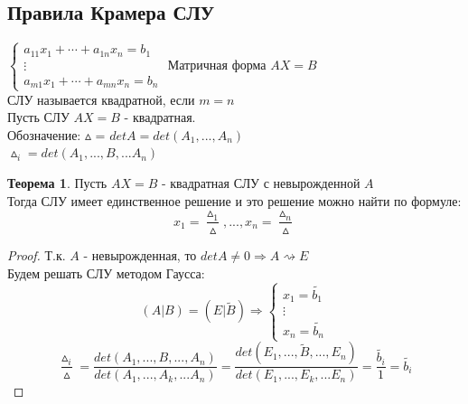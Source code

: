 \documentclass[a4paper, 12pt]{article}
\theoremstyle{definition}
\newtheorem*{theorem}{Теорема}
\begin{document}
  \subsection{Правила Крамера СЛУ}
  $\begin{cases}
    a_{11}x_1 + \cdots + a_{1n}x_n = b_1 \\
    \vdots \\ 
    a_{m1}x_1 + \cdots + a_{mn}x_n = b_n 
  \end{cases}$
  Матричная форма $AX=B$ \\ 
  СЛУ называется квадратной, если $m=n$ \\
  Пусть СЛУ $AX=B$  - квадратная. \\
  Обозначение: $\vartriangle$ = $detA = det(A_1,...,A_n)$\\
  $\vartriangle_i = det(A_1,...,B,...A_n)$
  \begin{theorem}
    Пусть $AX = B$ - квадратная СЛУ с невырожденной $A$ \\
    Тогда СЛУ имеет единственное решение и это решение можно найти по формуле:
    $$x_1 = \frac{\vartriangle_1}{\vartriangle },...,x_n = \frac{\vartriangle_n}{\vartriangle }$$  
  \end{theorem} 
  \begin{proof}
    Т.к. $A$ - невырожденная, то $detA \not = 0 \Longrightarrow A\rightsquigarrow E$\\
    Будем решать СЛУ методом Гаусса:
    $$(A|B) = (E|\widetilde{B}
    ) \Longrightarrow \begin{cases}
      x_1 = \widetilde{b_1}\\
      \vdots \\
      x_n = \widetilde{b_n}
    \end{cases}$$
    $$\frac{\vartriangle_i}{\vartriangle } = \frac{det(A_1,...,B,...,A_n)}{det(A_1,...,A_k,...A_n)} = \frac{det(E_1,...,\widetilde{B},...,E_n)}{det(E_1,...,E_k,...E_n)} = \frac{\widetilde{b_i}}{1} = \widetilde{b_i}$$  
  \end{proof} 
\end{document}
